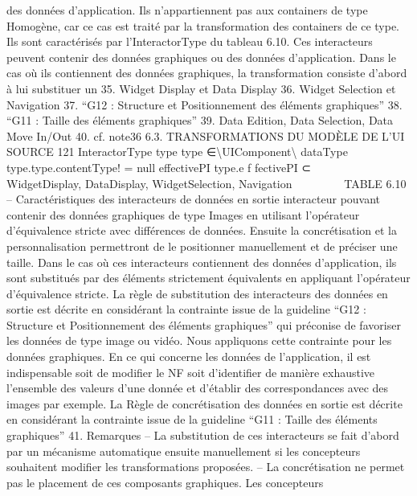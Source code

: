 \documentclass{article}
\begin{document}
des donn\'{e}es d’application. Ils n’appartiennent pas aux containers de type Homog\`{e}ne, car ce cas est
trait\'{e} par la transformation des containers de ce type. Ils sont caract\'{e}ris\'{e}s par l’InteractorType du
tableau 6.10.
Ces interacteurs peuvent contenir des donn\'{e}es graphiques ou des donn\'{e}es d’application. Dans le
cas o\`{u} ils contiennent des donn\'{e}es graphiques, la transformation consiste d’abord \`{a} lui substituer un
35. Widget Display et Data Display
36. Widget Selection et Navigation
37. “G12 : Structure et Positionnement des \'{e}l\'{e}ments graphiques”
38. “G11 : Taille des \'{e}l\'{e}ments graphiques”
39. Data Edition, Data Selection, Data Move In/Out
40. cf. note36
6.3. TRANSFORMATIONS DU MODÈLE DE L’UI SOURCE
121
InteractorType
type
type ∈\textbackslash{}{UIComponent\textbackslash{}}
dataType
type.type.contentType! = null
effectivePI
type.e f fectivePI ⊂







WidgetDisplay,
DataDisplay,
WidgetSelection,
Navigation







TABLE 6.10 – Caract\'{e}ristiques des interacteurs de donn\'{e}es en sortie
interacteur pouvant contenir des donn\'{e}es graphiques de type Images en utilisant l’op\'{e}rateur d’\'{e}quivalence stricte avec diff\'{e}rences de donn\'{e}es. Ensuite la concr\'{e}tisation et la personnalisation permettront
de le positionner manuellement et de pr\'{e}ciser une taille.
Dans le cas o\`{u} ces interacteurs contiennent des donn\'{e}es d’application, ils sont substitu\'{e}s par des
\'{e}l\'{e}ments strictement \'{e}quivalents en appliquant l’op\'{e}rateur d’\'{e}quivalence stricte.
La r\`{e}gle de substitution des interacteurs des donn\'{e}es en sortie
est d\'{e}crite en consid\'{e}rant la
contrainte issue de la guideline “G12 : Structure et Positionnement des \'{e}l\'{e}ments graphiques” qui
pr\'{e}conise de favoriser les donn\'{e}es de type image ou vid\'{e}o. Nous appliquons cette contrainte pour les
donn\'{e}es graphiques. En ce qui concerne les donn\'{e}es de l’application, il est indispensable soit de modiﬁer le NF soit d’identiﬁer de mani\`{e}re exhaustive l’ensemble des valeurs d’une donn\'{e}e et d’\'{e}tablir
des correspondances avec des images par exemple.
La R\`{e}gle de concr\'{e}tisation des donn\'{e}es en sortie
est d\'{e}crite en consid\'{e}rant la contrainte issue de
la guideline “G11 : Taille des \'{e}l\'{e}ments graphiques” 41.
Remarques
– La substitution de ces interacteurs se fait d’abord par un m\'{e}canisme automatique ensuite manuellement si les concepteurs souhaitent modiﬁer les transformations propos\'{e}es.
– La concr\'{e}tisation ne permet pas le placement de ces composants graphiques. Les concepteurs
\end{document}
